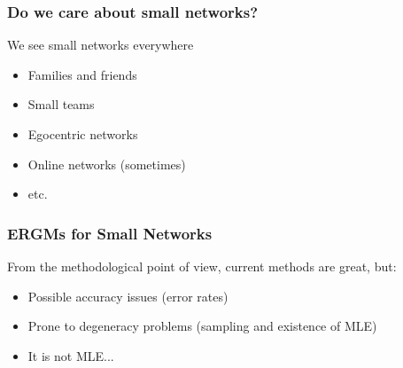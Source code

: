 \documentclass[aspectratio=169, 9pt]{beamer}\usepackage[]{graphicx}\usepackage[]{color}
\begin{document}
\begin{frame}
\frametitle{Do we care about small networks?}

\begin{minipage}{.40\linewidth}
We see small networks everywhere\pause

\begin{itemize}[<+->]
\item Families and friends
\item Small teams
\item Egocentric networks
\item Online networks (sometimes)
\item etc.
\end{itemize}
\end{minipage}
\hfill
{}
\end{frame}

\begin{frame}
\frametitle{ERGMs for Small Networks}

From the methodological point of view, current methods are great, but:\pause

\begin{itemize}
\item Possible accuracy issues (error rates)\pause
\item Prone to degeneracy problems (sampling and existence of MLE)\pause
\item It is not MLE...
\end{itemize}

\end{frame}
\end{document}
